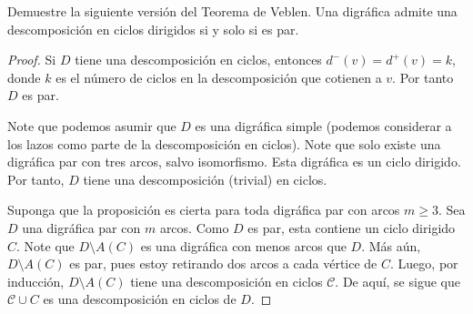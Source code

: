 \documentclass[12pt]{article}
\newenvironment{problem}[2][Problema]{\begin{trivlist}
\item[\hskip \labelsep {\bfseries #1}\hskip \labelsep {\bfseries #2.}]}{\end{trivlist}}
\begin{document}
\begin{problem}{2.4.2} Demuestre la siguiente versión del Teorema de Veblen. Una digráfica admite una descomposición en ciclos dirigidos si y solo si es par.
\end{problem}
\begin{proof}
Si $D$ tiene una descomposición en ciclos, entonces $d^-(v) = d^+(v) = k$, donde $k$ es el número de ciclos en la descomposición que cotienen a $v.$ Por tanto $D$ es par. 

Note que podemos asumir que $D$ es una digráfica simple (podemos considerar a los lazos como parte de la descomposición en ciclos). Note que solo existe una digráfica par con tres arcos, salvo isomorfismo. Esta digráfica es un ciclo dirigido. Por tanto, $D$ tiene una descomposición (trivial) en ciclos. 

Suponga que la proposición es cierta para toda digráfica par con arcos  $m \geq 3.$ Sea $D$ una digráfica par con $m$ arcos. Como $D$ es par, esta contiene un ciclo dirigido $C.$ Note que $D \setminus A(C)$ es una digráfica con menos arcos que $D$. Más aún, $D \setminus A(C)$ es par, pues estoy retirando dos arcos a cada vértice de $C.$ Luego, por inducción, $D \setminus A(C)$ tiene una descomposición en ciclos $\mathcal{C}.$ De aquí, se sigue que $\mathcal{C} \cup C$ es una descomposición en ciclos de $D.$

\end{proof}




\printbibliography
\end{document}
